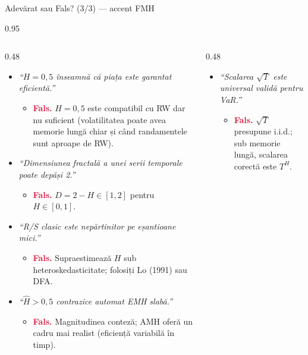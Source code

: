 \documentclass[9pt, aspectratio=169, t]{beamer}
\begin{document}
\begin{frame}[shrink=25]{Adevărat sau Fals? (3/3) --- accent FMH}
\begin{cminipage}{0.95\textwidth}
\begin{columns}[T]
\begin{column}{0.48\textwidth}
\begin{itemize}\setlength{\itemsep}{1pt}
    \item \textit{``$H = 0{,}5$ înseamnă că piața este garantat eficientă.''}
    \begin{itemize}\setlength{\itemsep}{0pt}
        \item[] \textcolor{Crimson}{\textbf{Fals.}} $H = 0{,}5$ este compatibil cu RW dar nu suficient (volatilitatea poate avea memorie lungă chiar și când randamentele sunt aproape de RW).
    \end{itemize}
    \item \textit{``Dimensiunea fractală a unei serii temporale poate depăși 2.''}
    \begin{itemize}\setlength{\itemsep}{0pt}
        \item[] \textcolor{Crimson}{\textbf{Fals.}} $D = 2 - H \in [1, 2]$ pentru $H \in [0, 1]$.
    \end{itemize}
    \item \textit{``R/S clasic este nepărtinitor pe eșantioane mici.''}
    \begin{itemize}\setlength{\itemsep}{0pt}
        \item[] \textcolor{Crimson}{\textbf{Fals.}} Supraestimează $H$ sub heteroskedasticitate; folosiți Lo (1991) sau DFA.
    \end{itemize}
    \item \textit{``$\hat H > 0{,}5$ contrazice automat EMH slabă.''}
    \begin{itemize}\setlength{\itemsep}{0pt}
        \item[] \textcolor{Crimson}{\textbf{Fals.}} Magnitudinea conteză; AMH oferă un cadru mai realist (eficiență variabilă în timp).
    \end{itemize}
\end{itemize}
\end{column}
\begin{column}{0.48\textwidth}
\begin{itemize}\setlength{\itemsep}{1pt}
    \item \textit{``Scalarea $\sqrt T$ este universal validă pentru VaR.''}
    \begin{itemize}\setlength{\itemsep}{0pt}
        \item[] \textcolor{Crimson}{\textbf{Fals.}} $\sqrt T$ presupune i.i.d.; sub memorie lungă, scalarea corectă este $T^H$.

\end{itemize}
\end{itemize}
\end{column}
\end{columns}
\end{cminipage}
\end{frame}
\end{document}
